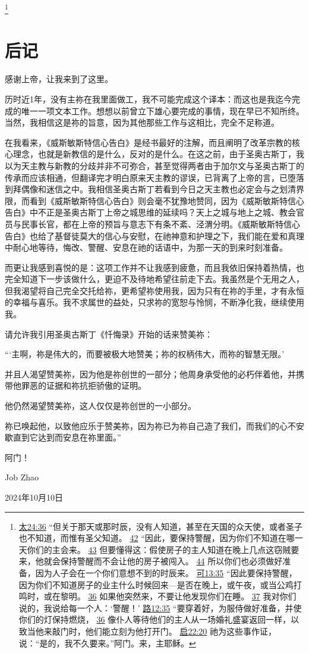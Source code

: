 \documentclass[12pt, a4paper, oneside]{ctexart}
\begin{document}
	\footnote {
		\href{https://biblehub.com/matthew/24-36.htm}{太24:36} “但关于那天或那时辰，没有人知道，甚至在天国的众天使，或者圣子也不知道，而惟有圣父知道。
		\href{https://biblehub.com/matthew/24-42.htm}{42} “因此，要保持警醒，因为你们不知道在哪一天你们的主会来。
		\href{https://biblehub.com/matthew/24-43.htm}{43} 但要懂得这：假使房子的主人知道在晚上几点这窃贼要来，他就会保持警醒而不会让他的房子被闯入。
		\href{https://biblehub.com/matthew/24-44.htm}{44} 所以你们也必须做好准备，因为人子会在一个你们意想不到的时辰来。
		\href{https://biblehub.com/mark/13-35.htm}{可13:35} “因此要保持警醒，因为你们不知道房子的业主什么时候回来---是否在晚上，或午夜，或当公鸡打鸣时，或在黎明。
		\href{https://biblehub.com/mark/13-36.htm}{36} 如果他突然来，不要让他发现你们在睡。
		\href{https://biblehub.com/mark/13-37.htm}{37} 我对你们说的，我说给每一个人：‘警醒！’
		\href{https://biblehub.com/luke/12-35.htm}{路12:35} “要穿着好，为服侍做好准备，并使你们的灯保持燃烧，
		\href{https://biblehub.com/luke/12-36.htm}{36} 像仆人等待他们的主人从一场婚礼盛宴返回一样，以致当他来敲门时，他们能立刻为他打开门。
		\href{https://biblehub.com/revelation/22-20.htm}{启22:20} 祂为这些事作证，说：“是的，我不久要来。”阿门。来，主耶稣。
	}
\thispagestyle{empty}
\newpage

\section*{后记}

感谢上帝，让我来到了这里。

历时近1年，没有主祢在我里面做工，我不可能完成这个译本：而这也是我迄今完成的唯一一项文本工作。想想以前曾立下雄心要完成的事情，现在早已不知所终。当然，我相信这是祢的旨意，因为其他那些工作与这相比，完全不足称道。

在我看来，《威斯敏斯特信心告白》是经书最好的注解，而且阐明了改革宗教的核心理念，也就是新教信的是什么，反对的是什么。在这之前，由于圣奥古斯丁，我以为天主教与新教的分歧并非不可弥合，甚至觉得两者由于加尔文与圣奥古斯丁的传承而应该相通，但翻译完才明白原来天主教的谬误，已背离了上帝的言，已堕落到拜偶像和迷信之中。我相信圣奥古斯丁若看到今日之天主教也必定会与之划清界限，而看到《威斯敏斯特信心告白》则会毫不犹豫地赞同，因为《威斯敏斯特信心告白》中不正是圣奥古斯丁上帝之城思维的延续吗？天上之城与地上之城、教会官员与民事长官，都在上帝的预旨与意志下有条不紊、泾渭分明。《威斯敏斯特信心告白》也给了基督徒莫大的信心与安慰，在祂神意和护理之下，我们能在爱和真理中耐心地等待，悔改、警醒、安息在祂的话语中，为那一天的到来时刻准备。

而更让我感到喜悦的是：这项工作并不让我感到疲惫，而且我依旧保持着热情，也完全知道下一步该做什么，更迫不及待地希望往前走下去。我虽然是个无用之人，但我渴望将自己完全交托给祢，更希望祢使用我，因为只有在祢的手里，才有永恒的幸福与喜乐。我不求属世的益处，只求祢的宽恕与怜悯，不断净化我，继续使用我。

请允许我引用圣奥古斯丁《忏悔录》开始的话来赞美祢：

“‘主啊，祢是伟大的，而要被极大地赞美；祢的权柄伟大，而祢的智慧无限。’

并且人渴望赞美祢，因为他是祢创世的一部分；他周身承受他的必朽伴着他，并携带他罪恶的证据和祢抗拒骄傲的证明。

他仍然渴望赞美祢，这人仅仅是祢创世的一小部分。

祢已唤起他，以致他应乐于赞美祢，因为祢已为祢自己造了我们，而我们的心不安歇直到它达到而安息在祢里面。”

阿门！

\hfill Job Zhao

\hfill 2024年10月10日
\end{document}

